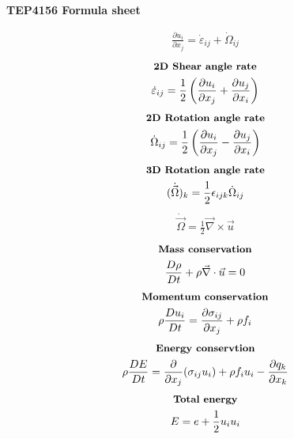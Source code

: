 \documentclass[10pt, a4paper]{article}
\newcommand{\derivative}[2]{\frac{\partial #1}{\partial #2}}
\begin{document}
\begin{center}
    \Large
    \textbf{TEP4156 Formula sheet}
    \vspace{0.5cm}
\end{center}

\begin{multicols*}{2}
    \begin{gather*}
        \derivative{ u_i}{x_j} = \dot{\varepsilon}_{ij} + \dot{\Omega}_{ij}
    \end{gather*}
    \begin{gather*}
        \textbf{\small 2D Shear angle rate} \\
        \dot{\varepsilon}_{ij} = \frac12\left( \derivative{ u_i}{x_j} +
        \derivative{ u_j}{x_i}\right)
    \end{gather*}
    \begin{gather*}
        \textbf{\small 2D Rotation angle rate} \\
        \dot{\Omega}_{ij} = \frac12\left( \derivative{ u_i}{x_j} -
        \derivative{ u_j}{x_i}\right)
    \end{gather*}
    \begin{gather*}
        \textbf{\small 3D Rotation angle rate} \\
        (\dot{\vec{\Omega}})_k = \frac12 \epsilon_{ijk}\dot{\Omega}_{ij}
    \end{gather*}
    \begin{gather*}
        \dot{\vec{\Omega}} = \frac12 \vec{\nabla}\times\vec{u}
    \end{gather*}
    \begin{gather*}
        \textbf{\small Mass conservation} \\
        \frac{D\rho}{Dt} + \rho \vec{\nabla} \cdot \vec{u} = 0
    \end{gather*}
    \begin{gather*}
        \textbf{\small Momentum conservation} \\
        \rho \frac{Du_i}{Dt} = \derivative{ \sigma_{ij}}{x_j} + \rho f_i
    \end{gather*}
    \begin{gather*}
        \textbf{\small Energy conservtion} \\
        \rho \frac{DE}{Dt} = \derivative{}{x_j}(\sigma_{ij} u_i) + \rho f_i u_i - \derivative{ q_k}{x_k}
    \end{gather*}
    \begin{gather*}
        \textbf{\small Total energy} \\
        E = e + \frac12 u_i u_i

\end{gather*}
\end{multicols*}
\end{document}
